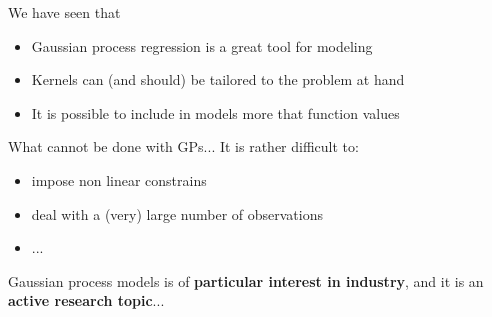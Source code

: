 \documentclass{beamer}
\begin{document}
\begin{frame}{}
\begin{block}{We have seen that}
\begin{itemize}
 \item Gaussian process regression is a great tool for modeling
 \item Kernels can (and should) be tailored to the problem at hand
 \item It is possible to include in models more that function values 
\end{itemize}
\end{block}
\vspace{0.4cm}
\begin{block}{What cannot be done with GPs...}
It is rather difficult to:
\begin{itemize}
 \item impose non linear constrains
 \item deal with a (very) large number of observations
 \item ...
\end{itemize}
\end{block}
\vspace{0.4cm}
Gaussian process models is of \textbf{particular interest in industry}, and it is an \textbf{active research topic}...
\end{frame}
\end{document}
